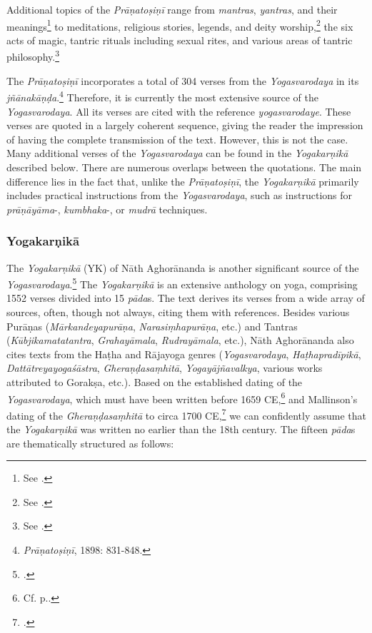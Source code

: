 Additional topics of the \textit{Prāṇatoṣiṇī} range from \textit{mantras}, \textit{yantras}, and their meanings\footnote{See \citeauthor[2010: 69-70]{slouber2010}.} to meditations, religious stories, legends, and deity worship,\footnote{See \citeauthor[1997: 149-150]{kinsley1997}.} the six acts of magic, tantric rituals including sexual rites, and various areas of tantric philosophy.\footnote{See \citeauthor[2010: 100]{urban2010}.}

The \textit{Prāṇatoṣiṇī} incorporates a total of 304 verses from the \textit{Yogasvarodaya} in its \textit{jñānakāṇḍa}.\footnote{\emph{Prāṇatoṣiṇī}, 1898: 831-848.} Therefore, it is currently the most extensive source of the \emph{Yogasvarodaya}. All its verses are cited with the reference \textit{yogasvarodaye}. These verses are quoted in a largely coherent sequence, giving the reader the impression of having the complete transmission of the text. However, this is not the case. Many additional verses of the \emph{Yogasvarodaya} can be found in the \emph{Yogakarṇikā} described below. There are numerous overlaps between the quotations. The main difference lies in the fact that, unlike the \textit{Prāṇatoṣiṇī}, the \emph{Yogakarṇikā} primarily includes practical instructions from the \textit{Yogasvarodaya}, such as instructions for \textit{prāṇāyāma}-, \textit{kumbhaka}-, or \textit{mudrā} techniques.

\subsubsection{Yogakarṇikā}

The \emph{Yogakarṇikā} (YK) of Nāth Aghorānanda is another significant source of the \emph{Yogasvarodaya}.\footnote{\cite{yogakarnika}.} The \emph{Yogakarṇikā} is an extensive anthology on yoga, comprising 1552 verses divided into 15 \textit{pāda}s. The text derives its verses from a wide array of sources, often, though not always, citing them with references. Besides various Purāṇas (\emph{Mārkandeyapurāṇa}, \emph{Narasiṃhapurāṇa}, etc.) and Tantras (\textit{Kūbjikamatatantra}, \textit{Grahayāmala}, \emph{Rudrayāmala}, etc.), Nāth Aghorānanda also cites texts from the Haṭha and Rājayoga genres (\emph{Yogasvarodaya}, \emph{Haṭhapradīpikā}, \emph{Dattātreyayogaśāstra}, \emph{Gheraṇḍasaṃhitā}, \emph{Yogayājñavalkya}, various works attributed to Gorakṣa, etc.). Based on the established dating of the \emph{Yogasvarodaya}, which must have been written before 1659 CE,\footnote{Cf. p.\pageref{dating}.} and Mallinson's dating of the \emph{Gheraṇḍasaṃhitā} to circa 1700 CE,\footnote{\citeauthor[2004: xiv]{MallinsonGheranda}.} we can confidently assume that the \emph{Yogakarṇikā} was written no earlier than the 18th century.
The fifteen \textit{pāda}s are thematically structured as follows:

